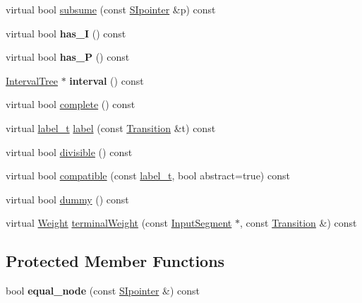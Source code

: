 \begin{DoxyCompactItemize}
\item 
virtual bool \mbox{\hyperlink{group__table_gaa50fe6e651b28c77839ddfaf1bbdcd4f}{subsume}} (const \mbox{\hyperlink{classSIpointer}{S\+Ipointer}} \&p) const
\item 
\mbox{\label{classSIpointer_a4cb39a0c156f3b09eb15feb12dad2434}} 
virtual bool {\bfseries has\+\_\+I} () const
\item 
\mbox{\label{classSIpointer_a433d1c2fbb2e79b7f0ada6b424739bec}} 
virtual bool {\bfseries has\+\_\+P} () const
\item 
\mbox{\label{classSIpointer_a1471edc06d0a40b154cb1b643b9f28f7}} 
\mbox{\hyperlink{classIntervalTree}{Interval\+Tree}} $\ast$ {\bfseries interval} () const
\item 
virtual bool \mbox{\hyperlink{group__table_ga638627bc96caa0f1dbf7093f0f70951b}{complete}} () const
\item 
virtual \mbox{\hyperlink{group__output_ga22fde970e635fcf63962743b2d5c441d}{label\+\_\+t}} \mbox{\hyperlink{group__table_ga6bdbea8e7013194f834be17932efe642}{label}} (const \mbox{\hyperlink{classTransition}{Transition}} \&t) const
\item 
virtual bool \mbox{\hyperlink{group__table_gac83e0619c17ce4efd589f73513706a6b}{divisible}} () const
\item 
virtual bool \mbox{\hyperlink{group__table_gaca7d3c4d141ecf2874a5e5512e0c02ff}{compatible}} (const \mbox{\hyperlink{group__output_ga22fde970e635fcf63962743b2d5c441d}{label\+\_\+t}}, bool abstract=true) const
\item 
virtual bool \mbox{\hyperlink{group__table_ga555753e41af94ac201a0c8c99babb83b}{dummy}} () const
\item 
virtual \mbox{\hyperlink{classWeight}{Weight}} \mbox{\hyperlink{group__table_ga6b46b59b3b465ba6a995f76ff34970ce}{terminal\+Weight}} (const \mbox{\hyperlink{classInputSegment}{Input\+Segment}} $\ast$, const \mbox{\hyperlink{classTransition}{Transition}} \&) const
\end{DoxyCompactItemize}
\subsection*{Protected Member Functions}
\begin{DoxyCompactItemize}
\item 
bool {\bfseries equal\+\_\+node} (const \mbox{\hyperlink{classSIpointer}{S\+Ipointer}} \&) const
\end{DoxyCompactItemize}
